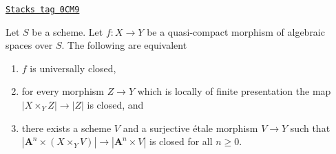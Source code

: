\begin{lemma}
\label{spaces-limits-lemma-test-universally-closed}
\href{https://stacks.math.columbia.edu/tag/0CM9}{\texttt{Stacks tag 0CM9}}

Let $S$ be a scheme.
Let $f : X \to Y$ be a quasi-compact morphism of algebraic spaces over $S$.
The following are equivalent
\begin{enumerate}
\item $f$ is universally closed,
\item for every morphism $Z \to Y$ which is locally of finite presentation
the map $|X \times_Y Z| \to |Z|$ is closed, and
\item there exists a scheme $V$ and a surjective \'etale morphism $V \to Y$
such that $|\mathbf{A}^n \times (X \times_Y V)| \to |\mathbf{A}^n \times V|$
is closed for all $n \geq 0$.
\end{enumerate}
\end{lemma}

